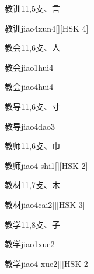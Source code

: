 \begin{entry}{教训}{11,5}{⽁、⾔}
  \begin{phonetics}{教训}{jiao4xun4}[][HSK 4]
  \end{phonetics}
\end{entry}

\begin{entry}{教会}{11,6}{⽁、⼈}
  \begin{phonetics}{教会}{jiao1hui4}
  \end{phonetics}
  \begin{phonetics}{教会}{jiao4hui4}
  \end{phonetics}
\end{entry}

\begin{entry}{教导}{11,6}{⽁、⼨}
  \begin{phonetics}{教导}{jiao4dao3}
  \end{phonetics}
\end{entry}

\begin{entry}{教师}{11,6}{⽁、⼱}
  \begin{phonetics}{教师}{jiao4 shi1}[][HSK 2]
  \end{phonetics}
\end{entry}

\begin{entry}{教材}{11,7}{⽁、⽊}
  \begin{phonetics}{教材}{jiao4cai2}[][HSK 3]
  \end{phonetics}
\end{entry}

\begin{entry}{教学}{11,8}{⽁、⼦}
  \begin{phonetics}{教学}{jiao1xue2}
  \end{phonetics}
  \begin{phonetics}{教学}{jiao4 xue2}[][HSK 2]
  \end{phonetics}
\end{entry}

